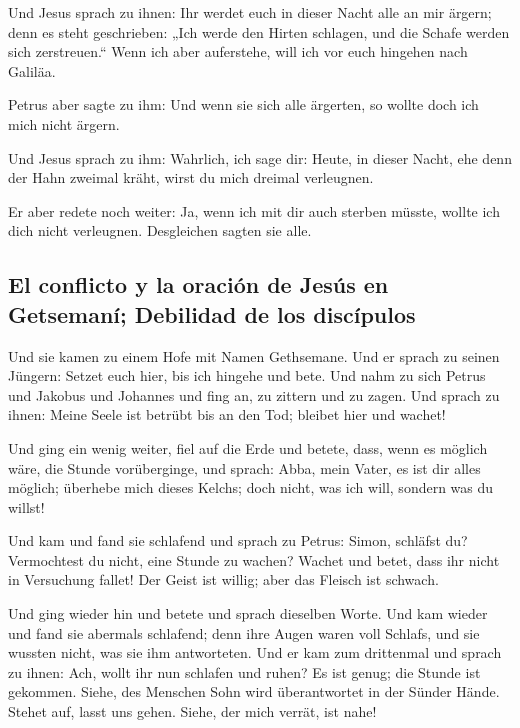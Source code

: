  Und Jesus sprach zu ihnen: Ihr werdet euch in dieser
Nacht alle an mir ärgern; denn es steht geschrieben: „Ich werde den
Hirten schlagen, und die Schafe werden sich zerstreuen.``
 Wenn ich aber auferstehe, will ich vor euch hingehen
nach Galiläa.

 Petrus aber sagte zu ihm: Und wenn sie sich alle
ärgerten, so wollte doch ich mich nicht ärgern.

 Und Jesus sprach zu ihm: Wahrlich, ich sage dir: Heute,
in dieser Nacht, ehe denn der Hahn zweimal kräht, wirst du mich dreimal
verleugnen.

 Er aber redete noch weiter: Ja, wenn ich mit dir auch
sterben müsste, wollte ich dich nicht verleugnen. Desgleichen sagten sie
alle.

\hypertarget{el-conflicto-y-la-oraciuxf3n-de-jesuxfas-en-getsemanuxed-debilidad-de-los-discuxedpulos}{%
\subsection{El conflicto y la oración de Jesús en Getsemaní; Debilidad
de los
discípulos}\label{el-conflicto-y-la-oraciuxf3n-de-jesuxfas-en-getsemanuxed-debilidad-de-los-discuxedpulos}}

 Und sie kamen zu einem Hofe mit Namen Gethsemane. Und er
sprach zu seinen Jüngern: Setzet euch hier, bis ich hingehe und bete.
 Und nahm zu sich Petrus und Jakobus und Johannes und
fing an, zu zittern und zu zagen.  Und sprach zu ihnen:
Meine Seele ist betrübt bis an den Tod; bleibet hier und wachet!

 Und ging ein wenig weiter, fiel auf die Erde und betete,
dass, wenn es möglich wäre, die Stunde vorüberginge,  und
sprach: Abba, mein Vater, es ist dir alles möglich; überhebe mich dieses
Kelchs; doch nicht, was ich will, sondern was du willst!

 Und kam und fand sie schlafend und sprach zu Petrus:
Simon, schläfst du? Vermochtest du nicht, eine Stunde zu wachen?
 Wachet und betet, dass ihr nicht in Versuchung fallet!
Der Geist ist willig; aber das Fleisch ist schwach.

 Und ging wieder hin und betete und sprach dieselben
Worte.  Und kam wieder und fand sie abermals schlafend;
denn ihre Augen waren voll Schlafs, und sie wussten nicht, was sie ihm
antworteten.  Und er kam zum drittenmal und sprach zu
ihnen: Ach, wollt ihr nun schlafen und ruhen? Es ist genug; die Stunde
ist gekommen. Siehe, des Menschen Sohn wird überantwortet in der Sünder
Hände.  Stehet auf, lasst uns gehen. Siehe, der mich
verrät, ist nahe!


